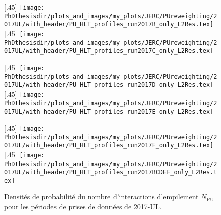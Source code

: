 \begin{figure}[p]
\centering
{}[.45\textwidth]
{\texttt{[image: \\PhDthesisdir/plots\_and\_images/my\_plots/JERC/PUreweighting/2017UL/with\_header/PU\_HLT\_profiles\_run2017B\_only\_L2Res.tex]}\vspace{-.5\baselineskip}}
\hfill
{}[.45\textwidth]
{\texttt{[image: \\PhDthesisdir/plots\_and\_images/my\_plots/JERC/PUreweighting/2017UL/with\_header/PU\_HLT\_profiles\_run2017C\_only\_L2Res.tex]}\vspace{-.5\baselineskip}}

\vspace{.75\baselineskip}

[.45\textwidth]
{\texttt{[image: \\PhDthesisdir/plots\_and\_images/my\_plots/JERC/PUreweighting/2017UL/with\_header/PU\_HLT\_profiles\_run2017D\_only\_L2Res.tex]}\vspace{-.5\baselineskip}}
\hfill
{}[.45\textwidth]
{\texttt{[image: \\PhDthesisdir/plots\_and\_images/my\_plots/JERC/PUreweighting/2017UL/with\_header/PU\_HLT\_profiles\_run2017E\_only\_L2Res.tex]}\vspace{-.5\baselineskip}}

\vspace{.75\baselineskip}

[.45\textwidth]
{\texttt{[image: \\PhDthesisdir/plots\_and\_images/my\_plots/JERC/PUreweighting/2017UL/with\_header/PU\_HLT\_profiles\_run2017F\_only\_L2Res.tex]}\vspace{-.5\baselineskip}}
\hfill
{}[.45\textwidth]
{\texttt{[image: \\PhDthesisdir/plots\_and\_images/my\_plots/JERC/PUreweighting/2017UL/with\_header/PU\_HLT\_profiles\_run2017BCDEF\_only\_L2Res.tex]}\vspace{-.5\baselineskip}}

\caption[Densités de probabilité de $N_\text{PU}$ pour 2017-UL.]{Densités de probabilité du nombre d'interactions d'empilement $N_\text{PU}$ pour les périodes de prises de données de 2017-UL.}
\label{fig-PU_profile_17UL}
\end{figure}
